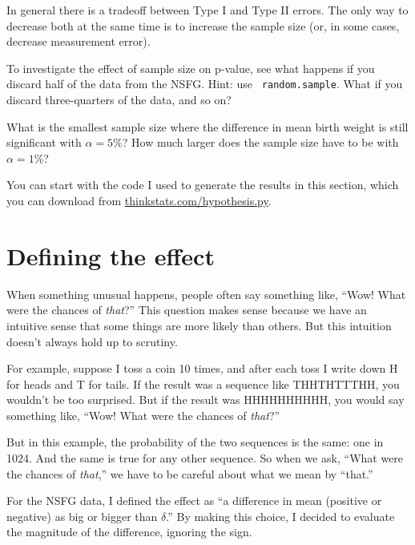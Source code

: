 \documentclass[12pt]{book}
\begin{document}
In general there is a tradeoff between Type I and Type II errors.
The only way to decrease both at the same time is to increase the
sample size (or, in some cases, decrease measurement error).


\begin{ex}

To investigate the effect of sample size on p-value, see what happens
if you discard half of the data from the NSFG.  Hint: use {\tt
  random.sample}.  What if you discard three-quarters of the data, and
so on?


What is the smallest sample size where the difference in mean birth
weight is still significant with $\alpha=5$\%?  How much
larger does the sample size have to be with $\alpha=1$\%?

You can start with the code I used to generate the results in this
section, which you can download from \url{thinkstats.com/hypothesis.py}.


\end{ex}


\section{Defining the effect}

When something unusual happens, people often say something like,
``Wow!  What were the chances of {\em that}?''  This question makes
sense because we have an intuitive sense that some things are more
likely than others.  But this intuition doesn't always hold up to
scrutiny.


For example, suppose I toss a coin 10 times, and after each toss I
write down H for heads and T for tails.  If the result was a sequence
like THHTHTTTHH, you wouldn't be too surprised.  But if the result was
HHHHHHHHHH, you would say something like, ``Wow!  What were the
chances of {\em that}?''

But in this example, the probability of the two sequences is the
same: one in 1024.  And the same is true for any other sequence.
So when we ask, ``What were the chances of {\em that},'' we have
to be careful about what we mean by ``that.''

For the NSFG data, I defined the effect as ``a difference in mean
(positive or negative) as big or bigger than $\delta$.''  By making
this choice, I decided to evaluate the magnitude of the difference,
ignoring the sign.
\end{document}
